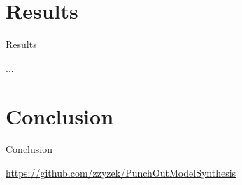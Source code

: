 \documentclass{beamer}
\begin{document}
%

  \section{Results}

  \begin{frame}[fragile]{Results}

    ...

  \end{frame}

  \section{Conclusion}

  \begin{frame}[fragile]{Conclusion}

    \begin{center}\url{https://github.com/zzyzek/PunchOutModelSynthesis}\end{center}

  \end{frame}
\end{document}
